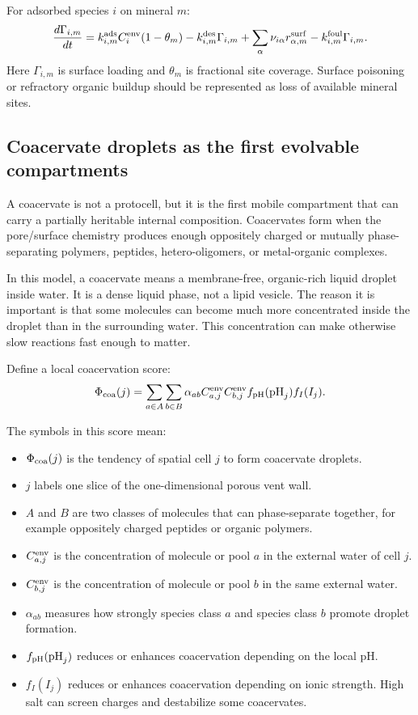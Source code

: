 \documentclass[11pt]{article}
\begin{document}
For adsorbed species $i$ on mineral $m$:
\begin{equation}
\frac{d\Gamma_{i,m}}{dt}
=
k_{i,m}^{\rm ads}C_i^{\rm env}(1-\theta_m)
-
k_{i,m}^{\rm des}\Gamma_{i,m}
+
\sum_\alpha \nu_{i\alpha} r_{\alpha,m}^{\rm surf}
-
k_{i,m}^{\rm foul}\Gamma_{i,m}.
\end{equation}
Here $\Gamma_{i,m}$ is surface loading and $\theta_m$ is fractional site
coverage. Surface poisoning or refractory organic buildup should be represented
as loss of available mineral sites.

\subsection{Coacervate droplets as the first evolvable compartments}

A coacervate is not a protocell, but it is the first mobile compartment that can
carry a partially heritable internal composition. Coacervates form when the
pore/surface chemistry produces enough oppositely charged or mutually
phase-separating polymers, peptides, hetero-oligomers, or metal-organic
complexes.

In this model, a coacervate means a membrane-free, organic-rich liquid droplet
inside water. It is a dense liquid phase, not a lipid vesicle. The reason it is
important is that some molecules can become much more concentrated inside the
droplet than in the surrounding water. This concentration can make otherwise
slow reactions fast enough to matter.

Define a local coacervation score:
\begin{equation}
\Phi_{\rm coa}(j)
=
\sum_{a\in A}\sum_{b\in B}
\alpha_{ab}
C_{a,j}^{\rm env}
C_{b,j}^{\rm env}
f_{\rm pH}(\mathrm{pH}_j)
f_I(I_j).
\end{equation}

The symbols in this score mean:
\begin{itemize}
  \item $\Phi_{\rm coa}(j)$ is the tendency of spatial cell $j$ to form
  coacervate droplets.
  \item $j$ labels one slice of the one-dimensional porous vent wall.
  \item $A$ and $B$ are two classes of molecules that can phase-separate
  together, for example oppositely charged peptides or organic polymers.
  \item $C_{a,j}^{\rm env}$ is the concentration of molecule or pool $a$ in
  the external water of cell $j$.
  \item $C_{b,j}^{\rm env}$ is the concentration of molecule or pool $b$ in
  the same external water.
  \item $\alpha_{ab}$ measures how strongly species class $a$ and species
  class $b$ promote droplet formation.
  \item $f_{\rm pH}(\mathrm{pH}_j)$ reduces or enhances coacervation depending
  on the local pH.
  \item $f_I(I_j)$ reduces or enhances coacervation depending on ionic
  strength. High salt can screen charges and destabilize some coacervates.
\end{itemize}
\end{document}
